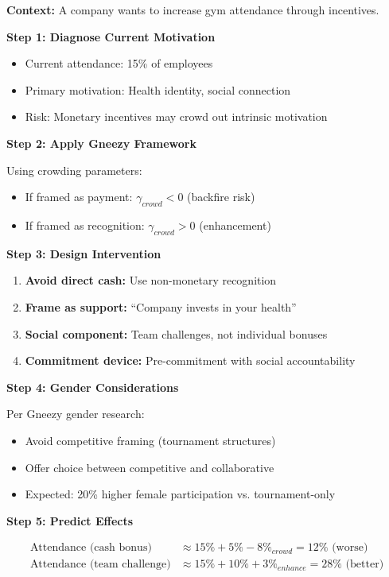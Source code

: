 \begin{tcolorbox}[colback=blue!5!white,colframe=blue!75!black,title=Application: Avoiding Crowding Out in Health Programs]
\textbf{Context:} A company wants to increase gym attendance through incentives.

\textbf{Step 1: Diagnose Current Motivation}
\begin{itemize}
    \item Current attendance: 15\% of employees
    \item Primary motivation: Health identity, social connection
    \item Risk: Monetary incentives may crowd out intrinsic motivation
\end{itemize}

\textbf{Step 2: Apply Gneezy Framework}

Using crowding parameters:
\begin{itemize}
    \item If framed as payment: $\gamma_{crowd} < 0$ (backfire risk)
    \item If framed as recognition: $\gamma_{crowd} > 0$ (enhancement)
\end{itemize}

\textbf{Step 3: Design Intervention}

\begin{enumerate}
    \item \textbf{Avoid direct cash:} Use non-monetary recognition
    \item \textbf{Frame as support:} ``Company invests in your health''
    \item \textbf{Social component:} Team challenges, not individual bonuses
    \item \textbf{Commitment device:} Pre-commitment with social accountability
\end{enumerate}

\textbf{Step 4: Gender Considerations}

Per Gneezy gender research:
\begin{itemize}
    \item Avoid competitive framing (tournament structures)
    \item Offer choice between competitive and collaborative
    \item Expected: 20\% higher female participation vs. tournament-only
\end{itemize}

\textbf{Step 5: Predict Effects}

\begin{align}
\text{Attendance (cash bonus)} &\approx 15\% + 5\% - 8\%_{crowd} = 12\% \text{ (worse)} \\
\text{Attendance (team challenge)} &\approx 15\% + 10\% + 3\%_{enhance} = 28\% \text{ (better)}
\end{align}
\end{tcolorbox}

